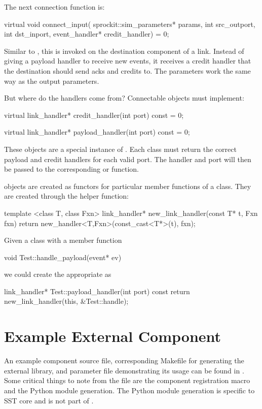 The next connection function is:
\begin{CppCode}
  virtual void connect_input(
    sprockit::sim_parameters* params,
    int src_outport,
    int dst_inport,
    event_handler* credit_handler) = 0;
\end{CppCode}
Similar to , this is invoked on the destination component of a link.
Instead of giving a payload handler to receive new events,
it receives a credit handler that the destination should send acks and credits to.
The parameters work the same way as the output parameters.

But where do the handlers come from? Connectable objects must implement:

\begin{CppCode}
virtual link_handler* credit_handler(int port) const = 0;

virtual link_handler* payload_handler(int port) const = 0;
\end{CppCode}

These  objects are a special instance of .
Each class must return the correct payload and credit handlers for each valid port.
The handler and port will then be passed to the corresponding  or  function.

 objects are created as functors for particular member functions of a class.
They are created through the helper function:

\begin{CppCode}
template <class T, class Fxn>
link_handler* new_link_handler(const T* t, Fxn fxn){
  return new_handler<T,Fxn>(const_cast<T*>(t), fxn);
}
\end{CppCode}
Given a class  with a member function

\begin{CppCode}
void Test::handle_payload(event* ev)
\end{CppCode}
we could create the appropriate  as

\begin{CppCode}
link_handler* Test::payload_handler(int port) const {
  return new_link_handler(this, &Test::handle);
}
\end{CppCode}

\section{Example External Component}
An example component source file, corresponding Makefile for generating the external library, and parameter file demonstrating its usage can be found in .
Some critical things to note from the file  are the component registration macro and the Python module generation.
The Python module generation is specific to SST core and is not part of \sstmacro.

